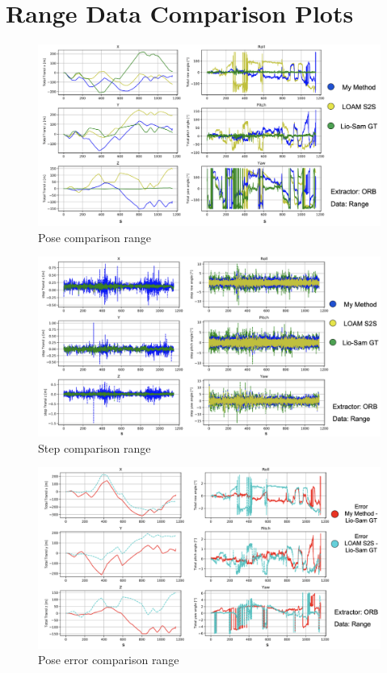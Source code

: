 \section{Range Data Comparison Plots}{
    
    \begin{figure}[ht]
        \centering
        \includegraphics[scale = 0.25]{images/comparison_appendix/pose_range.png}
        \caption{Pose comparison range}
        \label{fig:pose_comparison_range}
    \end{figure}
    
    \begin{figure}[ht]
        \centering
        \includegraphics[scale = 0.25]{images/comparison_appendix/steps_range.png}
        \caption{Step comparison range}
        \label{fig:step_comparison_range}
    \end{figure}

    \begin{figure}[ht]
        \centering
        \includegraphics[scale = 0.25]{images/comparison_appendix/pose_error_range.png}
        \caption{Pose error comparison range}
        \label{fig:pose_error_comparison_range}
    \end{figure}
    
}
